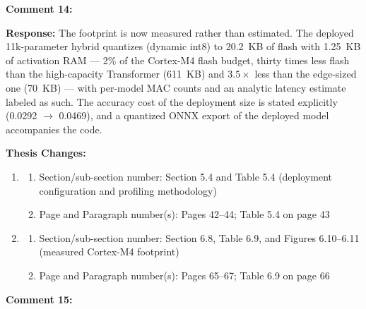 \documentclass[12pt,a4paper]{article}
\begin{document}
\vspace{\baselineskip}

\textbf{Comment 14:} 

\vspace{\baselineskip}

\textbf{Response:} The footprint is now measured rather than estimated. The
deployed 11k-parameter hybrid quantizes (dynamic int8) to 20.2~KB of flash with
1.25~KB of activation RAM --- 2\% of the Cortex-M4 flash budget, thirty times
less flash than the high-capacity Transformer (611~KB) and $3.5\times$ less
than the edge-sized one (70~KB) --- with per-model MAC counts and an analytic
latency estimate labeled as such. The accuracy cost of the deployment size is
stated explicitly (0.0292 $\rightarrow$ 0.0469), and a quantized ONNX export of
the deployed model accompanies the code.

\vspace{\baselineskip}

\textbf{Thesis Changes:}

\begin{enumerate}
    \item
    \begin{enumerate}
        \item Section/sub-section number: Section 5.4 and Table 5.4 (deployment configuration and profiling methodology)
        \item Page and Paragraph number(s): Pages 42--44; Table 5.4 on page 43
    \end{enumerate}
    \item
    \begin{enumerate}
        \item Section/sub-section number: Section 6.8, Table 6.9, and Figures 6.10--6.11 (measured Cortex-M4 footprint)
        \item Page and Paragraph number(s): Pages 65--67; Table 6.9 on page 66
    \end{enumerate}
\end{enumerate}

\vspace{\baselineskip}

\textbf{Comment 15:} 
\end{document}
